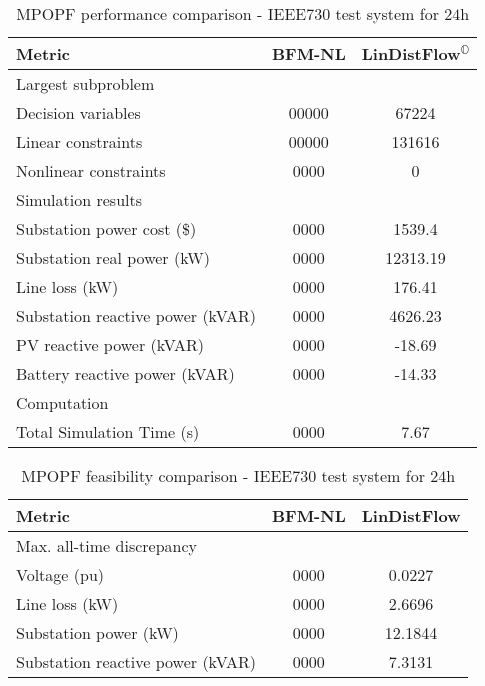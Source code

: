 \documentclass[../../outputs/main.tex]{subfiles}
\begin{document}
\begin{table}[t] %
    \centering
    \caption{MPOPF performance comparison - IEEE730 test system for $24$h}
    \begin{tabular}{|l|c|c|}
    \hline
    \textbf{Metric} & \textbf{BFM-NL} & \textbf{LinDistFlow\textsuperscript{\(\mathbb{O}\)}} \\ \hline
    Largest subproblem & \multicolumn{2}{c|}{} \\ \hline
    \quad Decision variables & {00000} & {67224} \\ \hline
    \quad Linear constraints & {00000} & {131616} \\ \hline
    \quad Nonlinear constraints & {0000} & {0} \\ \hline
    Simulation results  & \multicolumn{2}{c|}{} \\ \hline
    \quad Substation power cost (\$) & 0000 & 1539.4 \\ \hline
    \quad Substation real power (kW) & 0000 & 12313.19 \\ \hline
    \quad Line loss (kW) & 0000 & 176.41 \\ \hline
    \quad Substation reactive power (kVAR) & 0000 & 4626.23 \\ \hline
    \quad PV reactive power (kVAR) & 0000 & -18.69 \\ \hline
    \quad Battery reactive power (kVAR) & 0000 & -14.33 \\ \hline
    Computation  & \multicolumn{2}{c|}{} \\ \hline
    \quad Total Simulation Time (s) & 0000 & 7.67 \\ \hline
    \end{tabular}
    \label{table:opt-ieee730-24h}
    \vspace{-3mm}
\end{table}

\begin{table}[t]
    \centering
    \caption{MPOPF feasibility comparison - IEEE730 test system for $24$h}
    \begin{tabular}{|l|c|c|}
    \hline
    \textbf{Metric} & \textbf{BFM-NL} & \textbf{LinDistFlow} \\ \hline
    Max. all-time discrepancy & \multicolumn{2}{c|}{} \\ \hline
    \quad Voltage (pu) & 0000 & 0.0227 \\ \hline
    \quad Line loss (kW) & 0000 & 2.6696 \\ \hline
    \quad Substation power (kW) & 0000 & 12.1844 \\ \hline
    \quad Substation reactive power (kVAR) & 0000 & 7.3131 \\ \hline
    \end{tabular}
    \label{table:feas-ieee730-24h}
    \vspace{-3mm}
\end{table}
\end{document}
